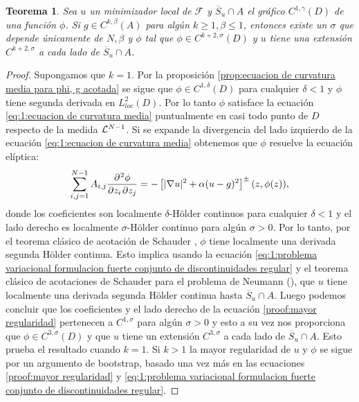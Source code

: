 \documentclass[a4paper,11pt,spanish, twoside, leqno]{tfm-uam}
\newtheorem{teo}{Teorema}[chapter]
\begin{document}
\begin{teo}\label{teo:mayor regularidad}
Sea $u$ un minimizador local de $\mathcal{F}$ y $\overline{S}_{u}\cap A$ el gráfico  $C^{1, \gamma}(D)$ de una función $\phi$. Si $g\in C^{k,\beta}(A)$ para algún $k\geq 1, \beta\leq 1$, entonces existe un $\sigma$ que depende únicamente de $N,\beta$ y $\phi$ tal que $\phi\in C^{k+2, \sigma}(D)$ y $u$ tiene una extensión $C^{k+2,\sigma}$ a cada lado de $\overline{S}_{u}\cap A$.
\end{teo}
\begin{proof}
Supongamos que $k=1$. Por la proposición \ref{prop:ecuacion de curvatura media para phi, g acotada} se sigue que $\phi\in C^{1,\delta}(D)$ para cualquier $\delta<1$ y $\phi$ tiene segunda derivada en $L^{2}_{loc}(D)$. Por lo tanto $\phi$ satisface la ecuación \ref{eq:1:ecuacion de curvatura media} puntualmente en casi todo punto de $D$ respecto de la medida $\mathcal{L}^{N-1}$. Si se expande la divergencia del lado izquierdo de la ecuación \ref{eq:1:ecuacion de curvatura media} obtenemos que $\phi$ resuelve la ecuación elíptica:
\begin{align}\label{proof:mayor regularidad}
\sum_{i,j=1}^{N-1}A_{i,j}\diffp{\phi}{z_{i},z_{j}}=-\left [ \abs{\nabla{u}}^{2}+\alpha (u-g)^{2}\right]^{\pm}(z,\phi(z)),
\end{align}
donde los coeficientes son localmente $\delta$-Hölder continuos para cualquier $\delta<1$ y el lado derecho es localmente $\sigma$-Hölder continuo para algún $\sigma>0$. Por lo tanto, por el teorema clásico de acotación de Schauder \cite[Teorema 9.19]{gilbarg2015elliptic}, $\phi$ tiene localmente una derivada segunda Hölder continua. Esto implica usando la ecuación \ref{eq:1:problema variacional formulacion fuerte conjunto de discontinuidades regular} y el teorema clásico de acotaciones de Schauder para el problema de Neumann (\cite[Teorema 6.31]{gilbarg2015elliptic}), que $u$ tiene localmente una derivada segunda Hölder continua hasta $\overline{S}_{u}\cap A$. Luego podemos concluir que los coeficientes y el lado derecho de la ecuación \ref{proof:mayor regularidad} pertenecen a $C^{1,\sigma}$ para algún $\sigma>0$ y esto a su vez nos proporciona que $\phi\in C^{3,\sigma}(D)$ y que $u$ tiene un extensión $C^{3,\sigma}$ a cada lado de $\overline{S}_{u}\cap A$. Esto prueba el resultado cuando $k=1$. Si $k>1$ la mayor regularidad de $u$ y $\phi$ se sigue por un argumento de bootstrap, basado una vez más en las ecuaciones \ref{proof:mayor regularidad} y \ref{eq:1:problema variacional formulacion fuerte conjunto de discontinuidades regular}.
\end{proof}
\end{document}
